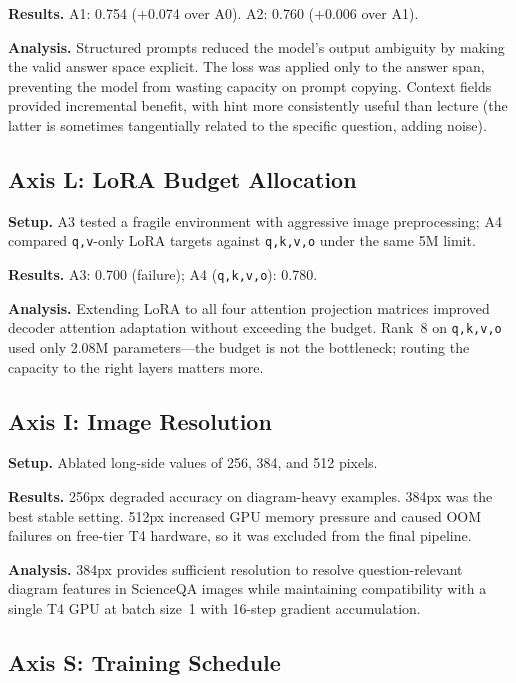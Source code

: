 \documentclass[11pt,twocolumn]{article}
\begin{document}
\textbf{Results.} A1: 0.754 ($+$0.074 over A0). A2: 0.760 ($+$0.006 over A1).

\textbf{Analysis.} Structured prompts reduced the model's output ambiguity by making the valid answer space explicit. The loss was applied only to the answer span, preventing the model from wasting capacity on prompt copying. Context fields provided incremental benefit, with hint more consistently useful than lecture (the latter is sometimes tangentially related to the specific question, adding noise).

\subsection{Axis L: LoRA Budget Allocation}

\textbf{Setup.} A3 tested a fragile environment with aggressive image preprocessing; A4 compared \texttt{q,v}-only LoRA targets against \texttt{q,k,v,o} under the same 5M limit.

\textbf{Results.} A3: 0.700 (failure); A4 (\texttt{q,k,v,o}): 0.780.

\textbf{Analysis.} Extending LoRA to all four attention projection matrices improved decoder attention adaptation without exceeding the budget. Rank~8 on \texttt{q,k,v,o} used only 2.08M parameters---the budget is not the bottleneck; routing the capacity to the right layers matters more.

\subsection{Axis I: Image Resolution}

\textbf{Setup.} Ablated long-side values of 256, 384, and 512 pixels.

\textbf{Results.} 256px degraded accuracy on diagram-heavy examples. 384px was the best stable setting. 512px increased GPU memory pressure and caused OOM failures on free-tier T4 hardware, so it was excluded from the final pipeline.

\textbf{Analysis.} 384px provides sufficient resolution to resolve question-relevant diagram features in ScienceQA images while maintaining compatibility with a single T4 GPU at batch size~1 with 16-step gradient accumulation.

\subsection{Axis S: Training Schedule}
\end{document}
